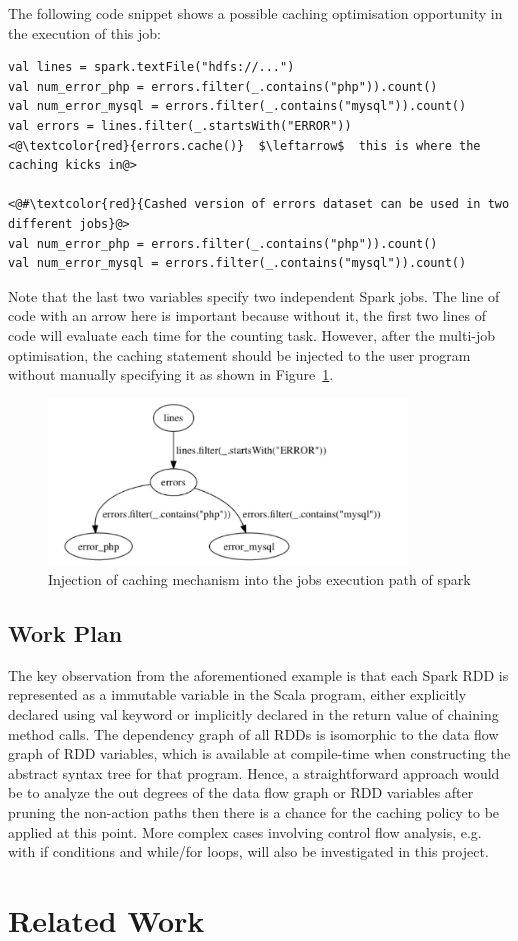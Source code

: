 \documentclass[11pt]{article}
\begin{document}
The following code snippet shows a possible caching optimisation opportunity in the execution of this job:

\begin{lstlisting}[frame=single, caption=Possible Caching Example, label=code:example]
val lines = spark.textFile("hdfs://...")
val num_error_php = errors.filter(_.contains("php")).count()
val num_error_mysql = errors.filter(_.contains("mysql")).count()
val errors = lines.filter(_.startsWith("ERROR"))
<@\textcolor{red}{errors.cache()}  $\leftarrow$  this is where the caching kicks in@>

<@#\textcolor{red}{Cashed version of errors dataset can be used in two different jobs}@>
val num_error_php = errors.filter(_.contains("php")).count()
val num_error_mysql = errors.filter(_.contains("mysql")).count()
\end{lstlisting} 

Note that the last two variables specify two independent Spark jobs. The line of code with an arrow here is important because without it, the first two lines of code will evaluate each time for the counting task. However, after the multi-job optimisation, the caching statement should be injected to the user program without manually specifying it as shown in Figure~\ref{fig:example}. 

\begin{figure}[htbp]
	\centering	 
		\includegraphics[width=0.85\textwidth]{images/1.JPEG}
	\caption{Injection of caching mechanism into the jobs execution path of spark}
	\label{fig:example}
\end{figure}

\subsection{Work Plan}
The key observation from the aforementioned example is that each Spark RDD is represented as a immutable variable in the Scala program, either explicitly declared using val keyword or implicitly declared in the return value of chaining method calls. The dependency graph of all RDDs is isomorphic to the data flow graph of RDD variables, which is available at compile-time when constructing the abstract syntax tree for that program. Hence, a straightforward approach would be to analyze the out degrees of the data flow graph or RDD variables after pruning the non-action paths then there is a chance for the caching policy to be applied at this point. More complex cases involving control flow analysis, e.g. with if conditions and while/for loops, will also be investigated in this project.

\section{Related Work}




\end{document}
